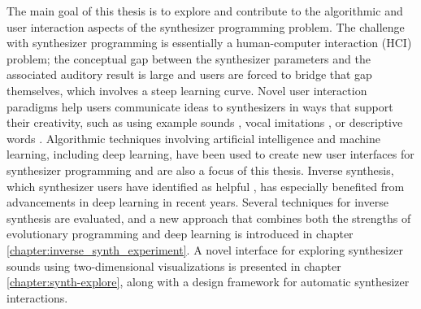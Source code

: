 The main goal of this thesis is to explore and contribute to the algorithmic and user interaction aspects of the synthesizer programming problem. The challenge with synthesizer programming is essentially a human-computer interaction (HCI) problem; the conceptual gap between the synthesizer parameters and the associated auditory result is large and users are forced to bridge that gap themselves, which involves a steep learning curve. 
Novel user interaction paradigms help users communicate ideas to synthesizers in ways that support their creativity, such as using example sounds \cite{horner1993machine, yee2018automatic}, vocal imitations \cite{cartwright2014synthassist, zhang2017iminet}, or descriptive words \cite{seago2013new}. Algorithmic techniques involving artificial intelligence and machine learning, including deep learning, have been used to create new user interfaces for synthesizer programming and are also a focus of this thesis. Inverse synthesis, which synthesizer users have identified as helpful \cite{krekovic2019insights}, has especially benefited from advancements in deep learning in recent years. Several techniques for inverse synthesis are evaluated, and a new approach that combines both the strengths of evolutionary programming and deep learning is introduced in chapter \ref{chapter:inverse_synth_experiment}. 
A novel interface for exploring synthesizer sounds using two-dimensional visualizations is presented in chapter \ref{chapter:synth-explore}, along with a design framework for automatic synthesizer interactions.


